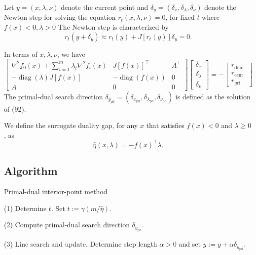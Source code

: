 \documentclass{article}
\begin{document}
Let $y=(x, \lambda, \nu)$ denote the current point and $\delta_y=\left(\delta_x, \delta_\lambda, \delta_\nu\right)$ denote the Newton step for solving the equation $r_t(x, \lambda, \nu)=0$, for fixed $t$ where $f(x)<0, \lambda>0$
The Newton step is characterized by
$$
r_t\left(y+\delta_y\right) \approx r_t(y)+J\left[r_t(y)\right] \delta_y=0 .
$$

In terms of $x, \lambda, \nu$, we have
$$
\left[\begin{array}{ccc}
\nabla^2 f_0(x)+\sum_{i=1}^m \lambda_i \nabla^2 f_i(x) & J[f(x)]^{\top} & A^{\top} \\
-\operatorname{diag}(\lambda) J[f(x)] & -\operatorname{diag}(f(x)) & 0 \\
A & 0 & 0
\end{array}\right]\left[\begin{array}{c}
\delta_x \\
\delta_\lambda \\
\delta_\nu
\end{array}\right]=-\left[\begin{array}{c}
r_{\text {dual }} \\
r_{\text {cent }} \\
r_{\text {pri }}
\end{array}\right]
$$
The primal-dual search direction $\delta_{y_{\mathrm{pd}}}=\left(\delta_{x_{\mathrm{pd}}}, \delta_{\lambda_{\mathrm{pd}}}, \delta_{\nu_{\mathrm{pd}}}\right)$ is defined as the solution of (92).

We define the surrogate duality gap, for any $x$ that satisfies $f(x)<0$ and $\lambda \geq 0$, as
$$
\hat{\eta}(x, \lambda)=-f(x)^{\top} \lambda .
$$

\subsection{Algorithm}

\begin{algorithm}
    \caption{Primal-dual interior-point method}
    \begin{algorithmic}[1]

            
            (1) Determine $t$. Set $t:=\gamma(m / \hat{\eta})$.
            
(2) Compute primal-dual search direction $\delta_{y_{\mathrm{pd}}}$.

(3) Line search and update.
Determine step length $\alpha>0$ and set $y:=y+\alpha \delta_{y_{\mathrm{pd}}}$.
            \EndWhile
        \EndProcedure
    \end{algorithmic}
    \label{alg:example_alg}
\end{algorithm}
\end{document}
